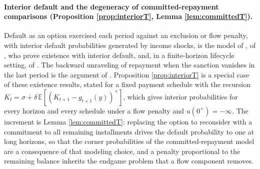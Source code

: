 \paragraph{Interior default and the degeneracy of committed-repayment comparisons (Proposition \ref{prop:interiorT}, Lemma \ref{lem:committedT}).} Default as an option exercised each period against an exclusion or flow penalty, with interior default probabilities generated by income shocks, is the model of \citet{eaton_debt_1981}, of \citet{chatterjee_quantitative_2007}, who prove existence with interior default, and, in a finite-horizon lifecycle setting, of \citet{campbell_model_2015}. The backward unraveling of repayment when the sanction vanishes in the last period is the argument of \citet{bulow_sovereign_1989}. Proposition \ref{prop:interiorT} is a special case of these existence results, stated for a fixed payment schedule with the recursion $K_t = \sigma + \delta\,\mathbb{E}[(K_{t+1} - g_{t+1}(y))^+]$, which gives interior probabilities for every horizon and every schedule under a flow penalty and $u(0^+) = -\infty$. The increment is Lemma \ref{lem:committedT}: replacing the option to reconsider with a commitment to all remaining installments drives the default probability to one at long horizons, so that the corner probabilities of the committed-repayment model are a consequence of that modeling choice, and a penalty proportional to the remaining balance inherits the endgame problem that a flow component removes.

